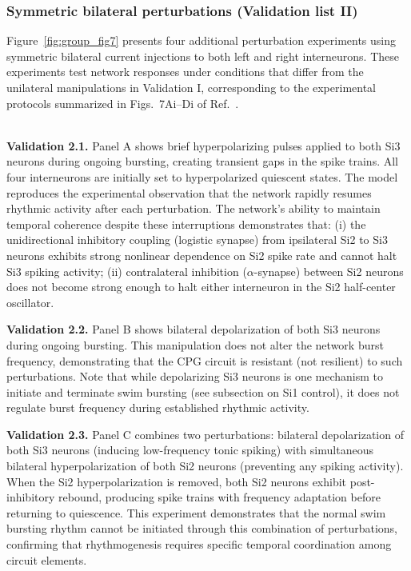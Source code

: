 \documentclass[nofootinbib,aip,amsmath,amssymb,preprint,twocolumn,floatfix,10pt]{revtex4-2}
\begin{document}

\subsubsection{Symmetric bilateral perturbations (Validation list II)}

Figure~\ref{fig:group_fig7} presents four additional perturbation experiments using symmetric bilateral current injections to both left and right interneurons. These experiments test network responses under conditions that differ from the unilateral manipulations in Validation I, corresponding to the experimental protocols summarized in Figs.~7Ai–Di of Ref.~\cite{SakuraiKatz2016}.

~\\
{\bf Validation 2.1.}
Panel A shows brief hyperpolarizing pulses applied to both Si3 neurons during ongoing bursting, creating transient gaps in the spike trains. All four interneurons are initially set to hyperpolarized quiescent states. The model reproduces the experimental observation that the network rapidly resumes rhythmic activity after each perturbation. The network's ability to maintain temporal coherence despite these interruptions demonstrates that: (i) the unidirectional inhibitory coupling (logistic synapse) from ipsilateral Si2 to Si3 neurons exhibits strong nonlinear dependence on Si2 spike rate and cannot halt Si3 spiking activity; (ii) contralateral inhibition ($\alpha$-synapse) between Si2 neurons does not become strong enough to halt either interneuron in the Si2 half-center oscillator. 

{\bf Validation 2.2.}
Panel B shows bilateral depolarization of both Si3 neurons during ongoing bursting. This manipulation does not alter the network burst frequency, demonstrating that the CPG circuit is resistant (not resilient) to such perturbations. Note that while depolarizing Si3 neurons is one mechanism to initiate and terminate swim bursting (see subsection on Si1 control), it does not regulate burst frequency during established rhythmic activity.

{\bf Validation 2.3.}
Panel C combines two perturbations: bilateral depolarization of both Si3 neurons (inducing low-frequency tonic spiking) with simultaneous bilateral hyperpolarization of both Si2 neurons (preventing any spiking activity). When the Si2 hyperpolarization is removed, both Si2 neurons exhibit post-inhibitory rebound, producing spike trains with frequency adaptation before returning to quiescence. This experiment demonstrates that the normal swim bursting rhythm cannot be initiated through this combination of perturbations, confirming that rhythmogenesis requires specific temporal coordination among circuit elements.
\end{document}
